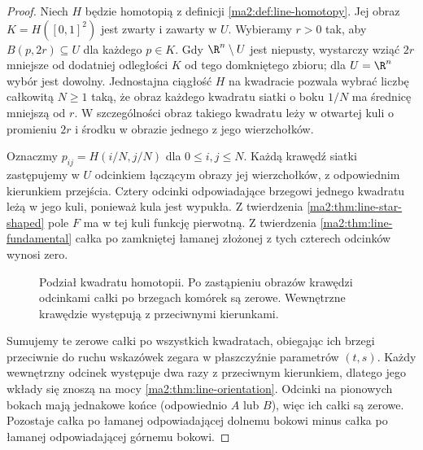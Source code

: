 \begin{proof}
Niech $H$ będzie homotopią z definicji
\ref{ma2:def:line-homotopy}.
Jej obraz $K=H([0,1]^2)$ jest zwarty
i zawarty w $U$. Wybieramy $r>0$ tak, aby
$B(p,2r)\subseteq U$ dla każdego $p\in K$.
Gdy $\R^n\setminus U$ jest niepusty,
wystarczy wziąć $2r$ mniejsze od dodatniej
odległości $K$ od tego domkniętego zbioru;
dla $U=\R^n$ wybór jest dowolny.
Jednostajna ciągłość $H$ na kwadracie
pozwala wybrać liczbę całkowitą $N\ge1$
taką, że obraz każdego kwadratu siatki
o boku $1/N$ ma średnicę mniejszą od $r$.
W szczególności obraz takiego kwadratu
leży w otwartej kuli o promieniu $2r$
i środku w obrazie jednego z jego wierzchołków.

Oznaczmy $p_{ij}=H(i/N,j/N)$ dla $0\le i,j\le N$.
Każdą krawędź siatki zastępujemy w $U$
odcinkiem łączącym obrazy jej wierzchołków,
z odpowiednim kierunkiem przejścia.
Cztery odcinki odpowiadające brzegowi jednego
kwadratu leżą w jego kuli, ponieważ
kula jest wypukła. Z twierdzenia
\ref{ma2:thm:line-star-shaped} pole $F$
ma w tej kuli funkcję pierwotną.
Z twierdzenia \ref{ma2:thm:line-fundamental}
całka po zamkniętej łamanej złożonej z tych
czterech odcinków wynosi zero.

\begin{figure}[htbp]
\centering
{}
\caption{Podział kwadratu homotopii. Po zastąpieniu
obrazów krawędzi odcinkami całki po brzegach
komórek są zerowe. Wewnętrzne krawędzie występują
z przeciwnymi kierunkami.}
\label{ma2:fig:line-homotopy-grid}
\end{figure}

Sumujemy te zerowe całki po wszystkich kwadratach,
obiegając ich brzegi przeciwnie do ruchu
wskazówek zegara w płaszczyźnie parametrów $(t,s)$.
Każdy wewnętrzny odcinek występuje dwa razy
z przeciwnym kierunkiem, dlatego jego wkłady
się znoszą na mocy
\ref{ma2:thm:line-orientation}.
Odcinki na pionowych bokach mają jednakowe
końce (odpowiednio $A$ lub $B$),
więc ich całki są zerowe.
Pozostaje całka po łamanej odpowiadającej
dolnemu bokowi minus całka po łamanej
odpowiadającej górnemu bokowi.


\end{proof}
